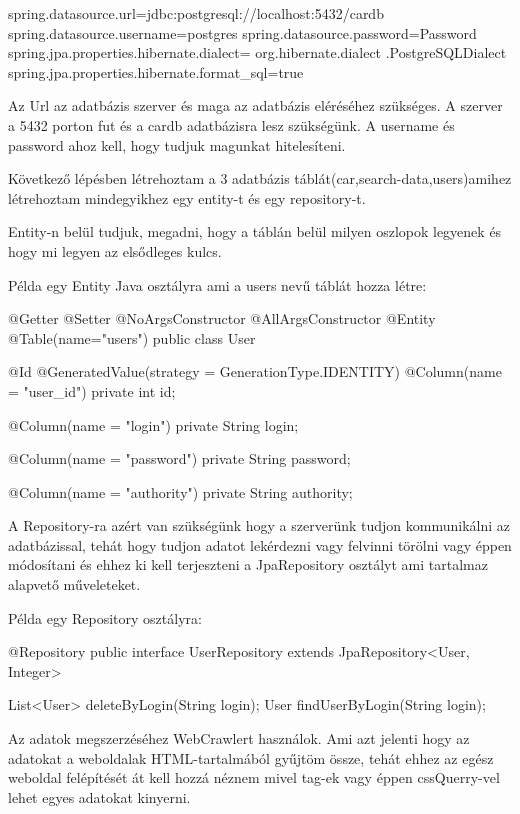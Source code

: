 \begin{java}
spring.datasource.url=jdbc:postgresql://localhost:5432/cardb
spring.datasource.username=postgres
spring.datasource.password=Password
spring.jpa.properties.hibernate.dialect= org.hibernate.dialect
.PostgreSQLDialect
spring.jpa.properties.hibernate.format_sql=true
\end{java}

Az Url az adatbázis szerver és maga az adatbázis eléréséhez szükséges. A szerver a 5432 porton fut és a cardb adatbázisra lesz szükségünk.
A username és password ahoz kell, hogy tudjuk magunkat hitelesíteni.

Következő lépésben létrehoztam a 3 adatbázis táblát(car,search-data,users)amihez létrehoztam mindegyikhez egy entity-t és egy repository-t.

Entity-n belül tudjuk, megadni, hogy a táblán belül milyen oszlopok legyenek és hogy mi legyen az elsődleges kulcs.

Példa egy Entity Java osztályra ami a users nevű táblát hozza létre:

\begin{java}
@Getter
@Setter
@NoArgsConstructor
@AllArgsConstructor
@Entity
@Table(name="users")
public class User {
    @Id
    @GeneratedValue(strategy = GenerationType.IDENTITY)
    @Column(name = "user_id")
    private int id;

    @Column(name = "login")
    private String login;

    @Column(name = "password")
    private String password;

    @Column(name = "authority")
    private String authority;
}
\end{java}

A Repository-ra azért van szükségünk hogy a szerverünk tudjon kommunikálni az adatbázissal, tehát hogy tudjon adatot lekérdezni vagy felvinni törölni vagy éppen módosítani és ehhez ki kell terjeszteni a JpaRepository osztályt ami tartalmaz alapvető műveleteket.

Példa egy Repository osztályra:

\begin{java}
@Repository
public interface UserRepository extends
			JpaRepository<User, Integer>
{

    List<User> deleteByLogin(String login);
    User findUserByLogin(String login);
}
\end{java}
\newpage


Az adatok megszerzéséhez WebCrawlert használok. Ami azt jelenti hogy az adatokat a weboldalak HTML-tartalmából gyűjtöm össze, tehát ehhez az egész weboldal felépítését át kell hozzá néznem mivel tag-ek vagy éppen cssQuerry-vel lehet egyes adatokat kinyerni. 

